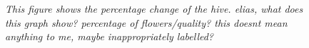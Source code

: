 		
			\begin{figure}
					\centering
					\caption{\textit{This figure shows the percentage change of the hive. elias, what does this graph show? percentage of flowers/quality? this doesnt mean anything to me, maybe inappropriately labelled?}}
				\label{fig:seasonalFlowers}
				\end{figure}
	
